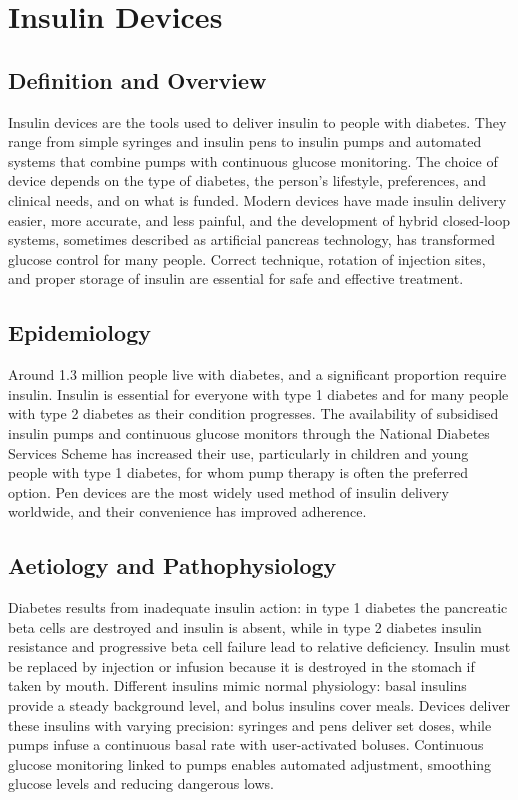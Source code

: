 \chapter{Insulin Devices}

\section*{Definition and Overview}
Insulin devices are the tools used to deliver insulin to people with diabetes. They range from simple syringes and insulin pens to insulin pumps and automated systems that combine pumps with continuous glucose monitoring. The choice of device depends on the type of diabetes, the person's lifestyle, preferences, and clinical needs, and on what is funded. Modern devices have made insulin delivery easier, more accurate, and less painful, and the development of hybrid closed-loop systems, sometimes described as artificial pancreas technology, has transformed glucose control for many people. Correct technique, rotation of injection sites, and proper storage of insulin are essential for safe and effective treatment.

\section*{Epidemiology}
Around 1.3 million people live with diabetes, and a significant proportion require insulin. Insulin is essential for everyone with type 1 diabetes and for many people with type 2 diabetes as their condition progresses. The availability of subsidised insulin pumps and continuous glucose monitors through the National Diabetes Services Scheme has increased their use, particularly in children and young people with type 1 diabetes, for whom pump therapy is often the preferred option. Pen devices are the most widely used method of insulin delivery worldwide, and their convenience has improved adherence.

\section*{Aetiology and Pathophysiology}
Diabetes results from inadequate insulin action: in type 1 diabetes the pancreatic beta cells are destroyed and insulin is absent, while in type 2 diabetes insulin resistance and progressive beta cell failure lead to relative deficiency. Insulin must be replaced by injection or infusion because it is destroyed in the stomach if taken by mouth. Different insulins mimic normal physiology: basal insulins provide a steady background level, and bolus insulins cover meals. Devices deliver these insulins with varying precision: syringes and pens deliver set doses, while pumps infuse a continuous basal rate with user-activated boluses. Continuous glucose monitoring linked to pumps enables automated adjustment, smoothing glucose levels and reducing dangerous lows.

